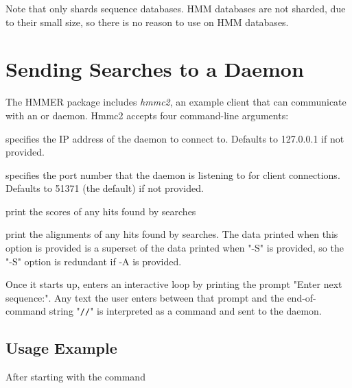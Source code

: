 \documentclass[notoc,justified]{tufte-book}    %
\begin{document}
Note that  only shards sequence databases.  HMM databases are not sharded, due to their small size, so there is no reason to use  on HMM databases. 


\section{Sending Searches to a Daemon}
The HMMER package includes {\em hmmc2}, an example client that can communicate with an  or  daemon.  Hmmc2 accepts four command-line arguments:

\begin{sreitems}{}
  \item[\monob{-i <IP address>}] specifies the IP address of the daemon to connect to.  Defaults to 127.0.0.1 if not provided.
  \item[\monob{-p <port>}] specifies the port number that the daemon is listening to for client connections.  Defaults to 51371 (the  default) if not provided.
  \item[\monob{-S}] print the scores of any hits found by searches
  \item[\monob{-A}] print the alignments of any hits found by searches.  The data printed when this option is provided is a superset of the data printed when "-S" is provided, so the "-S" option is redundant if -A is provided.
\end{sreitems}

Once it starts up,  enters an interactive loop by printing the prompt "Enter next sequence:".  Any text the user enters between that prompt and the end-of-command string "{\tt //}" is interpreted as a command and sent to the daemon.  

\subsection{Usage Example}
After starting  with the command

\vspace{1ex}
\vspace{1ex}
\end{document}
